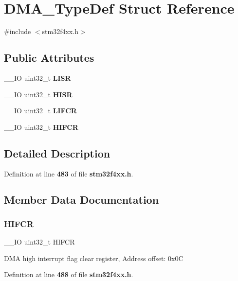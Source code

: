 \section{D\+M\+A\+\_\+\+Type\+Def Struct Reference}
\label{structDMA__TypeDef}


{\ttfamily \#include $<$stm32f4xx.\+h$>$}

\subsection*{Public Attributes}
\begin{DoxyCompactItemize}
\item 
\+\_\+\+\_\+\+IO uint32\+\_\+t \textbf{ L\+I\+SR}
\item 
\+\_\+\+\_\+\+IO uint32\+\_\+t \textbf{ H\+I\+SR}
\item 
\+\_\+\+\_\+\+IO uint32\+\_\+t \textbf{ L\+I\+F\+CR}
\item 
\+\_\+\+\_\+\+IO uint32\+\_\+t \textbf{ H\+I\+F\+CR}
\end{DoxyCompactItemize}


\subsection{Detailed Description}


Definition at line \textbf{ 483} of file \textbf{ stm32f4xx.\+h}.



\subsection{Member Data Documentation}
\mbox{\label{structDMA__TypeDef_ac55c27aeea4107813c1e7da3fcf46961}} 
\subsubsection{H\+I\+F\+CR}
{\footnotesize\ttfamily \+\_\+\+\_\+\+IO uint32\+\_\+t H\+I\+F\+CR}

D\+MA high interrupt flag clear register, Address offset\+: 0x0C 

Definition at line \textbf{ 488} of file \textbf{ stm32f4xx.\+h}.

\mbox{\label{structDMA__TypeDef_a6fe40f7ac1a18c2726b328b5ec02b262}} 
